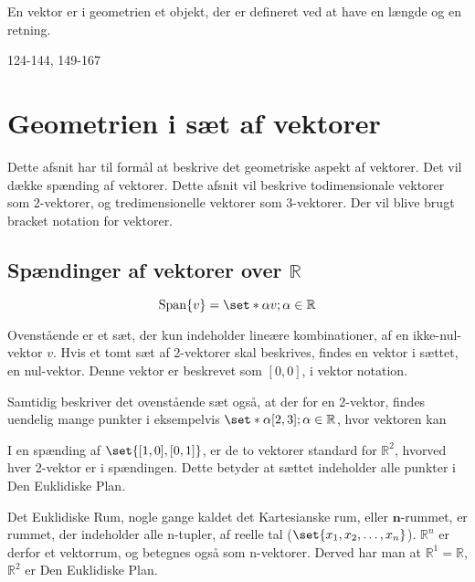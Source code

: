\begin{frdef}[Vektorer]
	En vektor er i geometrien et objekt, der er defineret ved at have en længde og en retning.
\end{frdef}



124-144, 149-167

\section{Geometrien i sæt af vektorer}
Dette afsnit har til formål at beskrive det geometriske aspekt af vektorer. Det vil dække spænding af vektorer. Dette afsnit vil beskrive todimensionale vektorer som 2-vektorer, og tredimensionelle vektorer som 3-vektorer. Der vil blive brugt bracket notation for vektorer.

\subsection{Spændinger af vektorer over $\mathbb{R}$}
 
\begin{equation}
	\mathrm{Span}\{v\}=\set*{\alpha v; \alpha\in\mathbb{R}}
\end{equation}

Ovenstående er et sæt, der kun indeholder lineære kombinationer, af en ikke-nul-vektor $v$.
Hvis et tomt sæt af 2-vektorer skal beskrives, findes en vektor i sættet, en nul-vektor. Denne vektor er beskrevet som $[0,0]$, i vektor notation.

Samtidig beskriver det ovenstående sæt også, at der for en 2-vektor, findes uendelig mange punkter i eksempelvis $\set*{\alpha[2,3]; \alpha\in\mathbb{R}}$, hvor vektoren kan 

I en spænding af $\set{[1,0],[0,1]}$, er de to vektorer standard for $\mathbb{R}^2$, hvorved hver 2-vektor er i spændingen. Dette betyder at sættet indeholder alle punkter i Den Euklidiske Plan.

\begin{frdef}
	Det Euklidiske Rum, nogle gange kaldet det Kartesianske rum, eller $\mathbf{n}$-rummet, er rummet, der indeholder alle n-tupler, af reelle tal ($\set{x_1,x_2,\dots,x_n}$). $\mathbb{R}^n$ er derfor et vektorrum, og betegnes også som n-vektorer. Derved har man at $\mathbb{R}^1=\mathbb{R}$, $\mathbb{R}^2$ er Den Euklidiske Plan.
\end{frdef}

